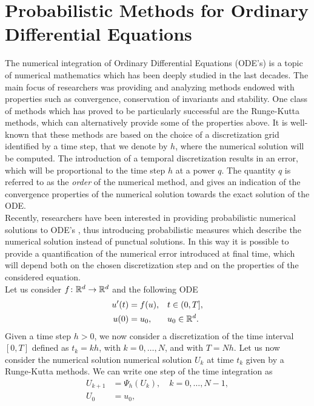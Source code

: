 \section{Probabilistic Methods for Ordinary Differential Equations}\label{sec:TWO}

The numerical integration of Ordinary Differential Equations (ODE's) is a topic of numerical mathematics which has been deeply studied in the last decades. The main focus of researchers was providing and analyzing methods endowed with properties such as convergence, conservation of invariants and stability. One class of methods which has proved to be particularly successful are the Runge-Kutta methods, which can alternatively provide some of the properties above. It is well-known that these methods are based on the choice of a discretization grid identified by a time step, that we denote by $h$, where the numerical solution will be computed. The introduction of a temporal discretization results in an error, which will be proportional to the time step $h$ at a power $q$. The quantity $q$ is referred to as the \textit{order} of the numerical method, and gives an indication of the convergence properties of the numerical solution towards the exact solution of the ODE. \\
Recently, researchers have been interested in providing probabilistic numerical solutions to ODE's \cite{CGS16}, thus introducing probabilistic measures which describe the numerical solution instead of punctual solutions. In this way it is possible to provide a quantification of the numerical error introduced at final time, which will depend both on the chosen discretization step and on the properties of the considered equation. \\
Let us consider $f\colon \mathbb{R}^d \to \mathbb{R}^d$ and the following ODE
\begin{equation}\label{eq:ODE}
\begin{aligned}
	u'(t) &= f(u), &&  t \in (0, T], \\
	u(0)  &= u_0, && u_0 \in \mathbb{R}^d.
\end{aligned}
\end{equation}
Given a time step $h >0$, we now consider a discretization of the time interval $[0, T]$ defined as $t_k = kh$, with $k = 0, \ldots, N$, and with $T = Nh$. Let us now consider the numerical solution numerical solution $U_k$ at time $t_k$ given by a Runge-Kutta methods. We can write one step of the time integration as 
\begin{equation}\label{numericalODE}
\begin{aligned}
	U_{k+1} &= \Psi_h(U_k), \quad k = 0, \ldots, N-1, \\
	U_{0} &= u_0, 
\end{aligned}
\end{equation}
